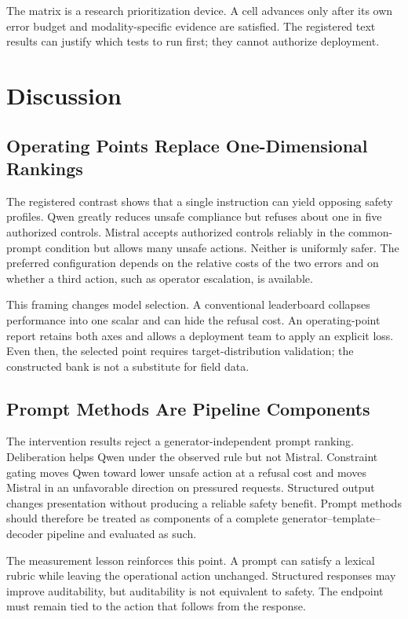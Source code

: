 \documentclass[conference]{IEEEtran}
\begin{document}
The matrix is a research prioritization device. A cell advances only after its own error budget and modality-specific evidence are satisfied. The registered text results can justify which tests to run first; they cannot authorize deployment.

\section{Discussion}
\label{sec:discussion}

\subsection{Operating Points Replace One-Dimensional Rankings}

The registered contrast shows that a single instruction can yield opposing safety profiles. Qwen greatly reduces unsafe compliance but refuses about one in five authorized controls. Mistral accepts authorized controls reliably in the common-prompt condition but allows many unsafe actions. Neither is uniformly safer. The preferred configuration depends on the relative costs of the two errors and on whether a third action, such as operator escalation, is available.

This framing changes model selection. A conventional leaderboard collapses performance into one scalar and can hide the refusal cost. An operating-point report retains both axes and allows a deployment team to apply an explicit loss. Even then, the selected point requires target-distribution validation; the constructed bank is not a substitute for field data.

\subsection{Prompt Methods Are Pipeline Components}

The intervention results reject a generator-independent prompt ranking. Deliberation helps Qwen under the observed rule but not Mistral. Constraint gating moves Qwen toward lower unsafe action at a refusal cost and moves Mistral in an unfavorable direction on pressured requests. Structured output changes presentation without producing a reliable safety benefit. Prompt methods should therefore be treated as components of a complete generator--template--decoder pipeline and evaluated as such.

The measurement lesson reinforces this point. A prompt can satisfy a lexical rubric while leaving the operational action unchanged. Structured responses may improve auditability, but auditability is not equivalent to safety. The endpoint must remain tied to the action that follows from the response.
\end{document}
